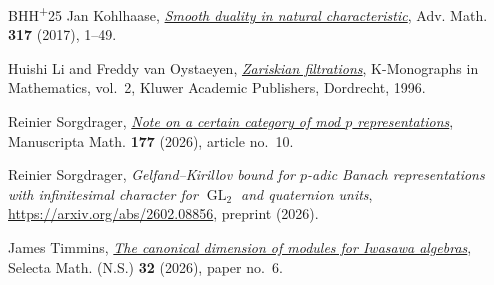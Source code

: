 \documentclass[11pt]{article}
\numberwithin{equation}{section}
\theoremstyle{definition}
\theoremstyle{remark}
\DeclareMathOperator{\GL}{GL}
\begin{document}
\begin{thebibliography}{BHH\textsuperscript{+}25}
Jan Kohlhaase,
\href{https://doi.org/10.1016/j.aim.2017.06.038}{\emph{Smooth duality
in natural characteristic}},
Adv. Math. \textbf{317} (2017), 1--49.

Huishi Li and Freddy van Oystaeyen,
\href{https://doi.org/10.1007/978-94-015-8759-4}{\emph{Zariskian
filtrations}}, K-Monographs in Mathematics, vol.~2,
Kluwer Academic Publishers, Dordrecht, 1996.

Reinier Sorgdrager,
\href{https://doi.org/10.1007/s00229-026-01690-x}{\emph{Note on a certain
category of mod $p$ representations}},
Manuscripta Math. \textbf{177} (2026), article no.~10.

Reinier Sorgdrager,
\emph{Gelfand--Kirillov bound for $p$-adic Banach representations
with infinitesimal character for $\GL_2$ and quaternion units},
\url{https://arxiv.org/abs/2602.08856}, preprint (2026).

James Timmins, \href{https://arxiv.org/abs/2306.09696}{\emph{The canonical dimension of modules for Iwasawa algebras}}, Selecta Math. (N.S.) \textbf{32} (2026), paper no.~6.

\end{thebibliography}

\newpage
\end{document}
